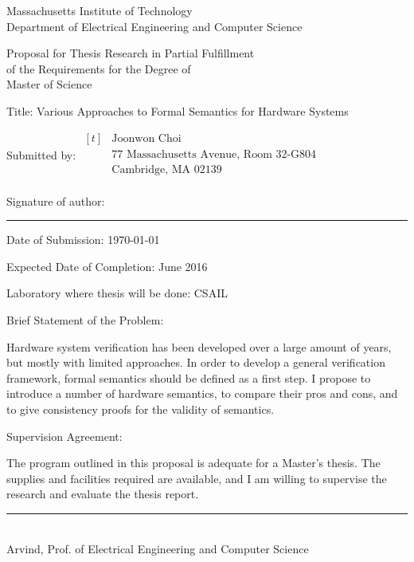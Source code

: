 
\begin{center}
  Massachusetts Institute of Technology\\
  Department of Electrical Engineering and Computer Science\dbsp

  Proposal for Thesis Research in Partial Fulfillment\\
  of the Requirements for the Degree of\\
  Master of Science\dbsp
\end{center}

{\parindent0pt

  Title: Various Approaches to Formal Semantics for Hardware Systems\dbsp

  Submitted by: $\begin{aligned}[t]
    &\textrm{Joonwon Choi}\\
    &\textrm{77 Massachusetts Avenue, Room 32-G804}\\
    &\textrm{Cambridge, MA 02139}\\
  \end{aligned}$\dbsp

  Signature of author: \rule{10cm}{0.4pt}\dbsp

  Date of Submission: \today\dbsp

  Expected Date of Completion: June 2016\dbsp

  Laboratory where thesis will be done: CSAIL\dbsp

  Brief Statement of the Problem:

  Hardware system verification has been developed over a large amount
  of years, but mostly with limited approaches. In order to develop a
  general verification framework, formal semantics should be defined
  as a first step. I propose to introduce a number of hardware
  semantics, to compare their pros and cons, and to give consistency
  proofs for the validity of semantics.\dbsp
  
  Supervision Agreement:

  The program outlined in this proposal is adequate for a Master's
  thesis. The supplies and facilities required are available, and I am
  willing to supervise the research and evaluate the thesis
  report.\dbsp
}

\begin{flushright}
  \rule{10cm}{0.4pt}\\
  Arvind, Prof. of Electrical Engineering and Computer Science
\end{flushright}

\newpage
